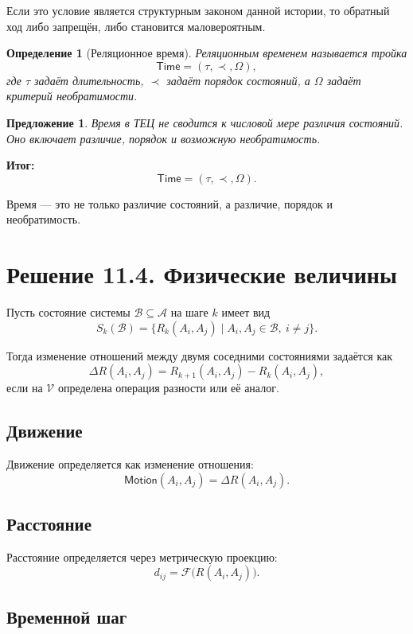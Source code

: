 \documentclass[12pt,a4paper]{article}
\newtheorem{definition}{Определение}[section]
\newtheorem{proposition}{Предложение}[section]
\newcommand{\Parts}{\mathcal A}
\newcommand{\SubParts}{\mathcal B}
\newcommand{\Rel}{R}
\newcommand{\Values}{\mathcal V}
\newcommand{\Time}{\mathsf{Time}}
\newcommand{\Motion}{\mathsf{Motion}}
\newcommand{\Metric}{\mathcal F}
\begin{document}
Если это условие является структурным законом данной истории, то обратный ход либо запрещён, либо становится маловероятным.

\begin{definition}[Реляционное время]
Реляционным временем называется тройка
\[
\Time=(\tau,\prec,\Omega),
\]
где \(\tau\) задаёт длительность, \(\prec\) задаёт порядок состояний, а \(\Omega\) задаёт критерий необратимости.
\end{definition}

\begin{proposition}
Время в ТЕЦ не сводится к числовой мере различия состояний. Оно включает различие, порядок и возможную необратимость.
\end{proposition}

\textbf{Итог:}
\[
\Time=(\tau,\prec,\Omega).
\]

Время --- это не только различие состояний, а различие, порядок и необратимость.

\section{Решение 11.4. Физические величины}

Пусть состояние системы \(\SubParts\subseteq\Parts\) на шаге \(k\) имеет вид
\[
S_k(\SubParts)=\{\Rel_k(A_i,A_j)\mid A_i,A_j\in\SubParts,\ i\neq j\}.
\]

Тогда изменение отношений между двумя соседними состояниями задаётся как
\[
\Delta\Rel(A_i,A_j)=\Rel_{k+1}(A_i,A_j)-\Rel_k(A_i,A_j),
\]
если на \(\Values\) определена операция разности или её аналог.

\subsection{Движение}

Движение определяется как изменение отношения:
\[
\Motion(A_i,A_j)=\Delta\Rel(A_i,A_j).
\]

\subsection{Расстояние}

Расстояние определяется через метрическую проекцию:
\[
d_{ij}=\Metric\bigl(\Rel(A_i,A_j)\bigr).
\]

\subsection{Временной шаг}
\end{document}
